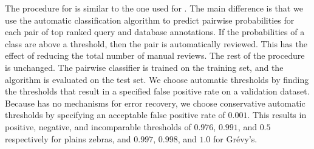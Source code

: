 
    The procedure for  is similar to the one used for .
    The main difference is that we use the automatic classification algorithm to predict pairwise probabilities
      for each pair of top ranked query and database annotations.
    If the probabilities of a class are above a threshold, then the pair is automatically reviewed.
    This has the effect of reducing the total number of manual reviews.
    The rest of the procedure is unchanged.
    The pairwise classifier is trained on the training set, and the algorithm is evaluated on the test set.
    We choose automatic thresholds by finding the thresholds that result in a specified false positive rate on a
      validation dataset.
    Because  has no mechanisms for error recovery, we choose conservative automatic thresholds by
      specifying an acceptable false positive rate of $0.001$.
    This results in positive, negative, and incomparable thresholds of $0.976$, $0.991$, and $0.5$ respectively
      for plains zebras, and $0.997$, $0.998$, and $1.0$ for Grévy's.


